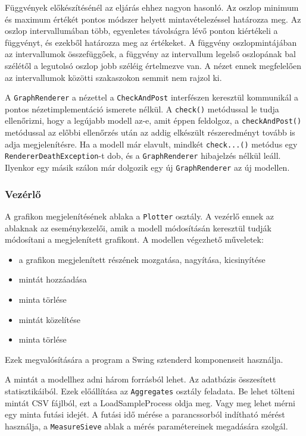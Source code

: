 Függvények előkészítésénél az eljárás ehhez nagyon hasonló.
Az oszlop minimum és maximum értékét pontos módszer helyett mintavételezéssel határozza meg. Az oszlop intervallumában több, egyenletes távolságra lévő ponton kiértékeli a függvényt, és ezekből határozza meg az értékeket.
A függvény oszlopmintájában az intervallumok összefüggőek, a függvény az intervallum legelső oszlopának bal szélétől a legutolsó oszlop jobb széléig értelmezve van.
A nézet ennek megfelelően az intervallumok közötti szakaszokon semmit nem rajzol ki.

A \texttt{GraphRenderer} a nézettel a \texttt{CheckAndPost} interfészen keresztül kommunikál a pontos nézetimplementáció ismerete nélkül.
A \texttt{check()} metódussal le tudja ellenőrizni, hogy a legújabb modell az-e, amit éppen feldolgoz, a \texttt{checkAndPost()} metódussal az előbbi ellenőrzés után az addig elkészült részeredményt tovább is adja megjelenítésre.
Ha a modell már elavult, mindkét \texttt{check...()} metódus egy \texttt{RendererDeathException}-t dob, és a \texttt{GraphRenderer} hibajelzés nélkül leáll. Ilyenkor egy másik szálon már dolgozik egy új \texttt{GraphRenderer} az új modellen.

\subsubsection{Vezérlő}

A grafikon megjelenítésének ablaka a \texttt{Plotter} osztály.
A vezérlő ennek az ablaknak az eseménykezelői, amik a modell módosításán keresztül tudják módosítani a megjelenített grafikont.
A modellen végezhető műveletek:
\begin{itemize}
\item a grafikon megjelenített részének mozgatása, nagyítása, kicsinyítése
\item mintát hozzáadása
\item minta törlése
\item mintát közelítése
\item minta törlése
\end{itemize}
Ezek megvalósítására a program a Swing sztenderd komponenseit használja.

A mintát a modellhez adni három forrásból lehet.
Az adatbázis összesített statisztikáiból.
Ezek előállítása az \texttt{Aggregates} osztály feladata.
Be lehet tölteni mintát CSV fájlból, ezt a LoadSampleProcess oldja meg.
Vagy meg lehet mérni egy minta futási idejét.
A futási idő mérése a parancssorból indítható mérést használja, a \texttt{MeasureSieve} ablak a mérés paramétereinek megadására szolgál.


